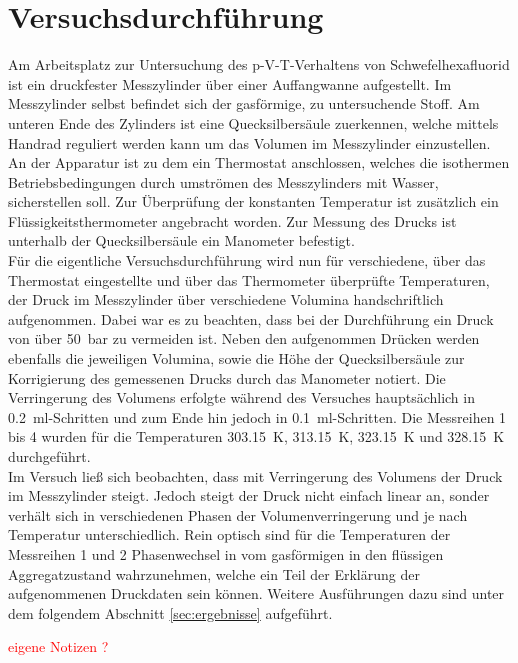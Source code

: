 \newpage
\section{Versuchsdurchführung}
\label{sec:durchfuerung}

Am Arbeitsplatz zur Untersuchung des p-V-T-Verhaltens von Schwefelhexafluorid ist ein druckfester Messzylinder über einer Auffangwanne aufgestellt. Im Messzylinder selbst befindet sich der gasförmige, zu untersuchende Stoff. Am unteren Ende des Zylinders ist eine Quecksilbersäule zuerkennen, welche mittels Handrad reguliert werden kann um das Volumen im Messzylinder einzustellen. An der Apparatur ist zu dem ein Thermostat anschlossen, welches die isothermen Betriebsbedingungen durch umströmen des Messzylinders mit Wasser, sicherstellen soll. Zur Überprüfung der konstanten Temperatur ist zusätzlich ein Flüssigkeitsthermometer angebracht worden. Zur Messung des Drucks ist unterhalb der Quecksilbersäule ein Manometer befestigt.\\
Für die eigentliche Versuchsdurchführung wird nun für verschiedene, über das Thermostat eingestellte und über das Thermometer überprüfte Temperaturen, der Druck im Messzylinder über verschiedene Volumina handschriftlich aufgenommen. Dabei war es zu beachten, dass bei der Durchführung ein Druck von über \SI{50}{\bar} zu vermeiden ist. Neben den aufgenommen Drücken werden ebenfalls die jeweiligen Volumina, sowie die Höhe der Quecksilbersäule zur Korrigierung des gemessenen Drucks durch das Manometer notiert. Die Verringerung des Volumens erfolgte während des Versuches hauptsächlich in \SI{0,2}{ml}-Schritten und zum Ende hin jedoch in \SI{0,1}{ml}-Schritten. Die Messreihen 1 bis 4 wurden für die Temperaturen \SI{303,15}{\kelvin}, \SI{313,15}{\kelvin}, \SI{323,15}{\kelvin} und \SI{328,15}{\kelvin} durchgeführt.\\

Im Versuch ließ sich beobachten, dass mit Verringerung des Volumens der Druck im Messzylinder steigt. Jedoch steigt der Druck nicht einfach linear an, sonder verhält sich in verschiedenen Phasen der Volumenverringerung und je nach Temperatur unterschiedlich. Rein optisch sind für die Temperaturen der Messreihen 1 und 2 Phasenwechsel in vom gasförmigen in den flüssigen Aggregatzustand wahrzunehmen, welche ein Teil der Erklärung der aufgenommenen Druckdaten sein können.\linebreak
Weitere Ausführungen dazu sind unter dem folgendem Abschnitt \ref{sec:ergebnisse} aufgeführt.

\vspace*{10mm}
\textcolor{red}{eigene Notizen ?}
